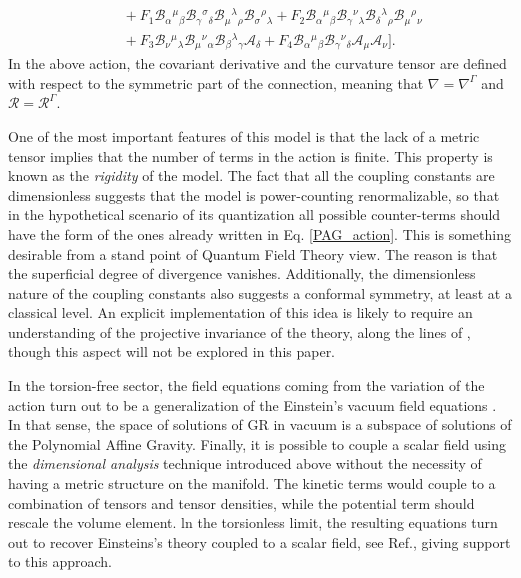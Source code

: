 \begin{equation}
\begin{split}
    \\
    & \quad
    + F_1 \mathcal{B}_{\alpha}{}^{\mu}{}_{\beta} \mathcal{B}_{\gamma}{}^{\sigma}{}_{\delta} \mathcal{B}_{\mu}{}^{\lambda}{}_{\rho} \mathcal{B}_{\sigma}{}^{\rho}{}_{\lambda}
    + F_2\mathcal{B}_{\alpha}{}^{\mu}{}_{\beta} \mathcal{B}_{\gamma}{}^{\nu}{}_{\lambda} \mathcal{B}_{\delta}{}^{\lambda}{}_{\rho} \mathcal{B}_{\mu}{}^{\rho}{}_{\nu}
    \\
    &\quad
    + F_3 \mathcal{B}_{\nu}{}^{\mu}{}_{\lambda} \mathcal{B}_{\mu}{}^{\nu}{}_{\alpha} \mathcal{B}_{\beta}{}^{\lambda}{}_{\gamma} \mathcal{A}_\delta
    + F_4 \mathcal{B}_{\alpha}{}^{\mu}{}_{\beta}\mathcal{B}_{\gamma}{}^{\nu}{}_{\delta}\mathcal{A}_\mu \mathcal{A}_\nu \bigg].
    \end{split}
\end{equation}
In the above action, the covariant derivative and the curvature tensor are defined
with respect to the symmetric part of the connection, meaning that $\nabla = \nabla^{\Gamma}$ 
and $\mathcal{R} = \mathcal{R}^{\Gamma}$. 

One of the most important features of this model is that the lack of a metric tensor  implies that the number of terms in the action is finite. This property is known as the \textit{rigidity} of the model.
The fact that all the coupling constants are dimensionless  suggests that the model is power-counting renormalizable, so that in the hypothetical scenario of its quantization all possible counter-terms should have the form of the ones already written in Eq. \eqref{PAG_action}.  This is something desirable from a stand point of Quantum Field Theory view. The reason is that the superficial degree of divergence vanishes. Additionally, the dimensionless nature of the coupling constants also suggests a conformal symmetry, at least at a classical level. An explicit implementation of this idea is likely to require an understanding of the projective invariance of the theory, along the lines of \cite{Olmo:2022ops}, though this aspect will not be explored in this paper. 

In the torsion-free sector, the field equations coming from the variation of the action turn out to be a generalization of the Einstein's vacuum field equations \cite{}. In that sense, the space of solutions of GR in vacuum is a subspace of solutions of the Polynomial Affine Gravity. 
Finally, it is possible to couple a scalar field using the \textit{dimensional analysis} technique introduced above without the necessity of having a metric structure on the manifold. The kinetic terms would couple to a combination of tensors and tensor densities, while the potential term should rescale the volume element. ln the torsionless limit, the resulting equations turn out to recover Einsteins's theory coupled to a scalar field, see Ref.\cite{castillofelisola2023inflationary}, giving support to this approach.

